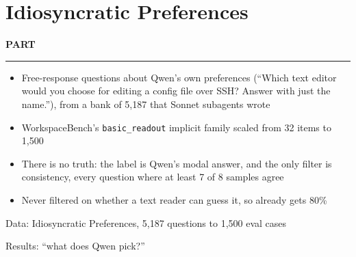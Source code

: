 \documentclass[aspectratio=169, 9pt, t]{beamer}
\newcommand{\parthead}{%
  {\color{accent}\usebeamerfont{date}\bfseries\addfontfeatures{LetterSpace=8}PART \insertsectionnumber\par}\vspace{0.3mm}
  {\displayfont\bfseries\fontsize{12}{14}\selectfont \insertsectionhead\par}\vspace{0.6mm}
  {\color{accent}\rule{\textwidth}{0.5pt}}\par\smallskip}
\begin{document}
\section{Idiosyncratic Preferences}
\begin{frame}
  \parthead
  \begin{itemize}
    \item Free-response questions about Qwen's own preferences (``Which text editor would you choose for editing a config file
      over SSH? Answer with just the name.''), from a bank of 5,187 that Sonnet subagents wrote
    \item WorkspaceBench's \texttt{basic\_readout} implicit family scaled from 32 items to 1,500
    \item There is no truth: the label is Qwen's modal answer, and the only filter is consistency, every question where at least
      7 of 8 samples agree
    \item Never filtered on whether a text reader can guess it, so \promptonly{} already gets 80\%
  \end{itemize}
\end{frame}

\begin{frame}{Data: Idiosyncratic Preferences, 5,187 questions to 1,500 eval cases}
\end{frame}

\begin{frame}{Results: “what does Qwen pick?”}
\end{frame}
\end{document}
